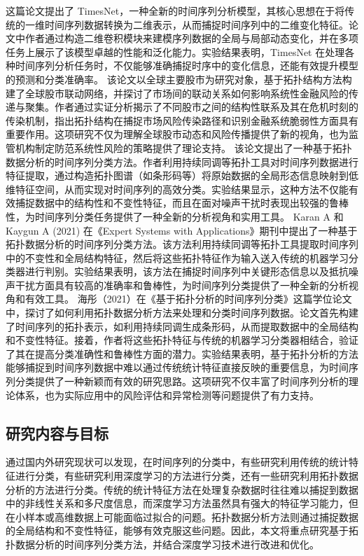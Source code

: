 这篇论文提出了 TimesNet，一种全新的时间序列分析模型，其核心思想在于将传统的一维时间序列数据转换为二维表示，从而捕捉时间序列中的二维变化特征。论文中作者通过构造二维卷积模块来建模序列数据的全局与局部动态变化，并在多项任务上展示了该模型卓越的性能和泛化能力。实验结果表明，TimesNet 在处理各种时间序列分析任务时，不仅能够准确捕捉时序中的变化信息，还能有效提升模型的预测和分类准确率。
该论文以全球主要股市为研究对象，基于拓扑结构方法构建了全球股市联动网络，并探讨了市场间的联动关系如何影响系统性金融风险的传递与聚集。作者通过实证分析揭示了不同股市之间的结构性联系及其在危机时刻的传染机制，指出拓扑结构在捕捉市场风险传染路径和识别金融系统脆弱性方面具有重要作用。这项研究不仅为理解全球股市动态和风险传播提供了新的视角，也为监管机构制定防范系统性风险的策略提供了理论支持。
该论文提出了一种基于拓扑数据分析的时间序列分类方法。作者利用持续同调等拓扑工具对时间序列数据进行特征提取，通过构造拓扑图谱（如条形码等）将原始数据的全局形态信息映射到低维特征空间，从而实现对时间序列的高效分类。实验结果显示，这种方法不仅能有效捕捉数据中的结构性和不变性特征，而且在面对噪声干扰时表现出较强的鲁棒性，为时间序列分类任务提供了一种全新的分析视角和实用工具。
Karan A 和 Kaygun A (2021) 在《Expert Systems with Applications》期刊中提出了一种基于拓扑数据分析的时间序列分类方法。该方法利用持续同调等拓扑工具提取时间序列中的不变性和全局结构特征，然后将这些拓扑特征作为输入送入传统的机器学习分类器进行判别。实验结果表明，该方法在捕捉时间序列中关键形态信息以及抵抗噪声干扰方面具有较高的准确率和鲁棒性，为时间序列分类提供了一种全新的分析视角和有效工具。
海彤（2021）在《基于拓扑分析的时间序列分类》这篇学位论文中，探讨了如何利用拓扑数据分析方法来处理和分类时间序列数据。论文首先构建了时间序列的拓扑表示，如利用持续同调生成条形码，从而提取数据中的全局结构和不变性特征。接着，作者将这些拓扑特征与传统的机器学习分类器相结合，验证了其在提高分类准确性和鲁棒性方面的潜力。实验结果表明，基于拓扑分析的方法能够捕捉到时间序列数据中难以通过传统统计特征直接反映的重要信息，为时间序列分类提供了一种新颖而有效的研究思路。这项研究不仅丰富了时间序列分析的理论体系，也为实际应用中的风险评估和异常检测等问题提供了有力支持。

\subsection{研究内容与目标}

通过国内外研究现状可以发现，在时间序列的分类中，有些研究利用传统的统计特征进行分类，有些研究利用深度学习的方法进行分类，还有一些研究利用拓扑数据分析的方法进行分类。传统的统计特征方法在处理复杂数据时往往难以捕捉到数据中的非线性关系和多尺度信息，而深度学习方法虽然具有强大的特征学习能力，但在小样本或高维数据上可能面临过拟合的问题。拓扑数据分析方法则通过捕捉数据的全局结构和不变性特征，能够有效克服这些问题。因此，本文将重点研究基于拓扑数据分析的时间序列分类方法，并结合深度学习技术进行改进和优化。


















